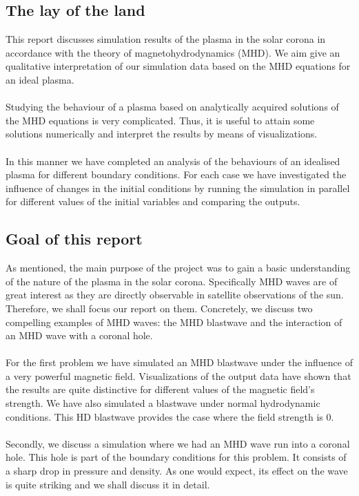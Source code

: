 

\subsection*{The lay of the land}

This report discusses simulation results of the plasma in the solar corona in accordance with the theory of magnetohydrodynamics (MHD). We aim give an qualitative interpretation of our simulation data based on the MHD equations for an ideal plasma.\\
\\
Studying the behaviour of a plasma based on analytically acquired solutions of the MHD equations is very complicated. Thus, it is useful to attain some solutions numerically and interpret the results by means of visualizations.\\
\\
In this manner we have completed an analysis of the behaviours of an idealised plasma for different boundary conditions. For each case we have investigated the influence of changes in the initial conditions by running the simulation in parallel for different values of the initial variables and comparing the outputs. 

\subsection*{Goal of this report}

As mentioned, the main purpose of the project was to gain a basic understanding of the nature of the plasma in the solar corona. Specifically MHD waves are of great interest as they are directly observable in satellite observations of the sun. Therefore, we shall focus our report on them. Concretely, we discuss two compelling examples of MHD waves: the MHD blastwave and the interaction of an MHD wave with a coronal hole.\\
\\
For the first problem we have simulated an MHD blastwave under the influence of a very powerful magnetic field. Visualizations of the output data have shown that the results are quite distinctive for different values of the magnetic field's strength. We have also simulated a blastwave under normal hydrodynamic conditions. This HD blastwave provides the case where the field strength is $0$.\\
\\
Secondly, we discuss a simulation where we had an MHD wave run into a coronal hole. This hole is part of the boundary conditions for this problem. It consists of a sharp drop in pressure and density. As one would expect, its effect on the wave is quite striking and we shall discuss it in detail. 

